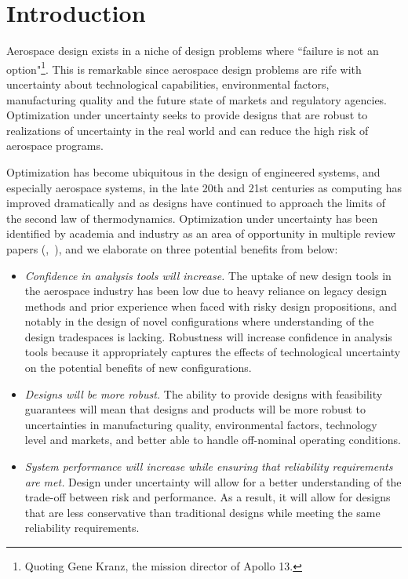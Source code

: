 \section{Introduction}

Aerospace design exists in a niche of design problems where ``failure is
not an option"\footnote{Quoting Gene Kranz, the mission director of Apollo 13.}.
This is remarkable since aerospace design problems are rife with uncertainty about
technological capabilities, environmental factors, manufacturing quality and the future
state of markets and regulatory agencies.
Optimization under uncertainty seeks to provide designs that are robust
to realizations of uncertainty in the real world and can reduce
the high risk of aerospace programs.

Optimization has become ubiquitous in the design of engineered systems, and especially aerospace systems,
in the late 20th and 21st centuries as computing has improved dramatically and as designs have
continued to approach the limits of the second law of thermodynamics. Optimization under uncertainty
has been identified by academia and industry as an area of opportunity
in multiple review papers (\cite{Zang2002},~\cite{Yao2011}),
and we elaborate on three potential benefits from \cite{Zang2002} below:
\begin{itemize}
    \item \emph{Confidence in analysis tools will increase.}
    The uptake of new design tools in the aerospace industry has been low
    due to heavy reliance on legacy design methods and prior experience when
    faced with risky design propositions, and notably in
    the design of novel configurations where understanding
    of the design tradespaces is lacking. Robustness will increase
    confidence in analysis tools because it appropriately captures the
    effects of technological uncertainty on the potential benefits of new
    configurations.
    \item \emph{Designs will be more robust.}
    The ability to provide designs with feasibility guarantees will mean
    that designs and products will be more robust to uncertainties in manufacturing quality,
    environmental factors, technology level and markets, and better able to
    handle off-nominal operating conditions.
    \item \emph{System performance will increase while ensuring that reliability requirements
    are met.}
    Design under uncertainty will allow for a better understanding of the trade-off between risk and
    performance. As a result, it will allow for designs that are less conservative than
    traditional designs while meeting the same reliability requirements.
\end{itemize}

